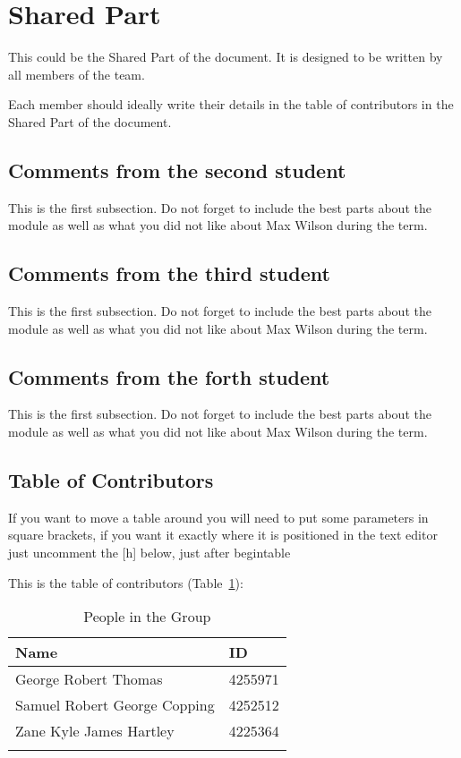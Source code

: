 \section{Shared Part}

This could be the Shared Part of the document. It is designed to be written by all members of the team.

Each member should ideally write their details in the table of contributors in the Shared Part of the document.



\subsection{Comments from the second student}
This is the first subsection. Do not forget to include the best parts about the module as well as what you did not like about Max Wilson during the term.

\subsection{Comments from the third student}
This is the first subsection. Do not forget to include the best parts about the module as well as what you did not like about Max Wilson during the term.

\subsection{Comments from the forth student}
This is the first subsection. Do not forget to include the best parts about the module as well as what you did not like about Max Wilson during the term.

\subsection{Table of Contributors}


If you want to move a table around you will need to put some parameters in square brackets, if you want it exactly where it is positioned in the text editor just uncomment the [h] below, just after begin{table}

This is the table of contributors (Table~\ref{authors}):
\begin{table}%
\centering
\caption{People in the Group}
\label{authors}
\begin{tabular}{|l|l|}
\hline
\textbf{Name} & \textbf{ID} \\
\hline
George Robert Thomas & 4255971\\
\hline
Samuel Robert George Copping & 4252512\\
\hline
Zane Kyle James Hartley & 4225364\\
\hline
& \\
\hline
\end{tabular}
\end{table}